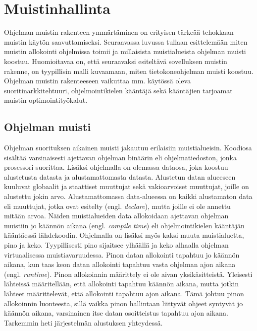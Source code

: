 \chapter{Muistinhallinta} \label{Toinen luku}

Ohjelman muistin rakenteen ymmärtäminen on erityisen tärkeää tehokkaan muistin käytön saavuttamiseksi. Seuraavassa luvussa tullaan esittelemään miten muistin allokointi ohjelmissa toimii
ja millaisista muistialueista ohjelman muisti koostuu. Huomioitavaa on, että seuraavaksi esiteltävä sovelluksen muistin rakenne, on tyypillisin malli kuvaamaan, miten tietokoneohjelman muisti koostuu. Ohjelman muistin rakenteeseen vaikuttaa mm. käytössä oleva suoritinarkkitehtuuri, ohjelmointikielen kääntäjä sekä kääntäjien tarjoamat muistin optimointityökalut.

\section{Ohjelman muisti}

Ohjelman suorituksen aikainen muisti jakautuu erilaisiin muistialueisin. Koodiosa sisältää varsinaisesti ajettavan ohjelman binäärin eli ohjelmatiedoston, jonka prosessori suorittaa. Lisäksi ohjelmalla on olemassa dataosa, joka koostuu alustetusta datasta ja alustamattomasta datasta. Alustetun datan alueeseen kuuluvat globaalit ja staattiset muuttujat sekä vakioarvoiset muuttujat, joille on alustettu jokin arvo. Alustamattomassa data-alueessa on kaikki alustamaton data eli muuttujat, jotka ovat esitelty (engl. \textit{declare}), mutta joille ei ole annettu mitään arvoa. Näiden muistialueiden data allokoidaan ajettavan ohjelman muistiin jo käännön aikana (engl. \textit{compile time}) eli ohjelmointikielen kääntäjän kääntäessä lähdekoodin. Ohjelmalla on lisäksi myös kaksi muuta muistialuetta, pino ja keko. Tyypillisesti pino sijaitsee ylhäällä ja keko alhaalla ohjelman virtuaalisessa muistiavaruudessa.\cite{mmic2010} Pinon datan allokointi tapahtuu jo käännön aikana, kun taas keon datan allokointi tapahtuu vasta ohjelman ajon aikana (engl. \textit{runtime})\cite{ddm2015book}. Pinon allokoinnin määrittely ei ole aivan yksikäsitteistä. Yleisesti lähteissä määritellään, että allokointi tapahtuu käännön aikana, mutta jotkin lähteet määrittelevät, että allokointi tapahtuu ajon aikana. Tämä johtuu pinon allokoinnin luonteesta, sillä vaikka pinon hallintaan liittyvät ohjeet syntyvät jo käännön aikana, varsinainen itse datan osoitteistus tapahtuu ajon aikana. Tarkemmin heti järjestelmän alustuksen yhteydessä.

